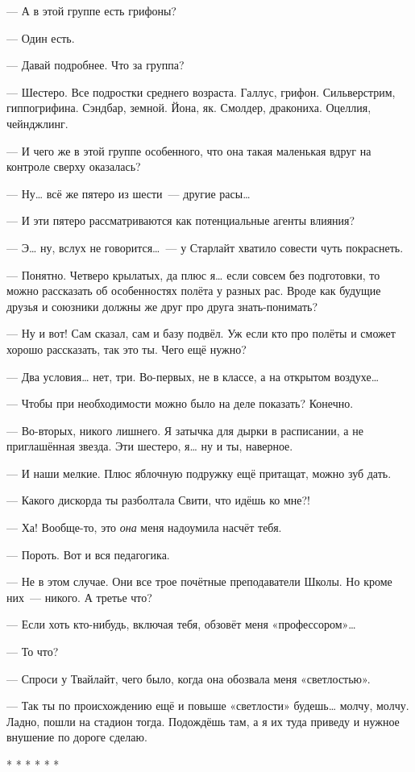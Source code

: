 \documentclass[fontsize=11pt,a5paper,titlepage=firstcover]{scrbook}
\begin{document}
--- А в этой группе есть грифоны?

--- Один есть.

--- Давай подробнее. Что за группа?

--- Шестеро. Все подростки среднего возраста. Галлус, грифон. Сильверстрим, гиппогрифина. Сэндбар, земной. Йона, як. Смолдер, дракониха. Оцеллия, чейнджлинг.

--- И чего же в этой группе особенного, что она такая маленькая вдруг на контроле сверху оказалась?

--- Ну{\ldots} всё же пятеро из шести~--- другие расы{\ldots}

--- И эти пятеро рассматриваются как потенциальные агенты влияния?

--- Э{\ldots} ну, вслух не говорится{\ldots}~--- у Старлайт хватило совести чуть покраснеть.

--- Понятно. Четверо крылатых, да плюс я{\ldots} если совсем без подготовки, то можно рассказать об особенностях полёта у разных рас. Вроде как будущие друзья и союзники должны же друг про друга знать-понимать?

--- Ну и вот! Сам сказал, сам и базу подвёл. Уж если кто про полёты и сможет хорошо рассказать, так это ты. Чего ещё нужно?

--- Два условия{\ldots} нет, три. Во-первых, не в классе, а на открытом воздухе{\ldots}

--- Чтобы при необходимости можно было на деле показать? Конечно.

--- Во-вторых, никого лишнего. Я затычка для дырки в расписании, а не приглашённая звезда. Эти шестеро, я{\ldots} ну и ты, наверное.

--- И наши мелкие. Плюс яблочную подружку ещё притащат, можно зуб дать.

--- Какого дискорда ты разболтала Свити, что идёшь ко мне?!

--- Ха! Вообще-то, это \emph{она} меня надоумила насчёт тебя.

--- Пороть. Вот и вся педагогика.

--- Не в этом случае. Они все трое почётные преподаватели Школы. Но кроме них~--- никого. А третье что?

--- Если хоть кто-нибудь, включая тебя, обзовёт меня «профессором»{\ldots}

--- То что?

--- Спроси у Твайлайт, чего было, когда она обозвала меня «светлостью».

--- Так ты по происхождению ещё и повыше «светлости» будешь{\ldots} молчу, молчу. Ладно, пошли на стадион тогда. Подождёшь там, а я их туда приведу и нужное внушение по дороге сделаю.
\begin{center}
	* * * * * *
\end{center}
\end{document}
